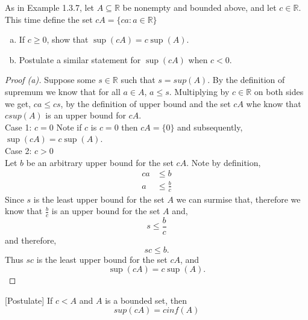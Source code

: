 \documentclass[12pt]{article}
\makeatletter
\theoremstyle{homework}
\newenvironment{exercise}[1]
{\def\@currentlabel{#1}\exercisecore}
{\endexercisecore}
\newcommand{\Reals}{\ensuremath{\mathbb R}}
\let\RR\Reals
\makeatother
\begin{document}
\begin{exercise}{1.3.5} As in Example 1.3.7, let $A \subseteq \RR$ be nonempty and bounded above, and let $c \in \RR$. 
  This time define the set $cA = \{ca: a\in \RR\}$  
  \begin{enumerate}[(a)]
  \item If $c\ge 0$, show that $\sup(cA) = c\sup(A)$.
  \item Postulate a similar statement for $\sup(cA)$ when $c<0$.
  \end{enumerate}
  \end{exercise}
  \begin{proof}[Proof (a)] 
    Suppose some $s \in \RR$ such that $s = sup(A)$. By the definition of supremum we know that for all $a \in A$, $a \le s$.
  Multiplying by $c \in \RR$ on both sides we get, $ca \le cs$, by the definition of upper bound and the set $cA$ whe know that $csup(A)$ is an upper bound for $cA$. \\

Case 1: $c = 0$ 
  Note if $c$ is $c = 0$ then $cA = \{0\}$ and subsequently, $\sup(cA) = c\sup(A)$. \\

  Case 2: $c > 0$\\
    Let $b$ be an arbitrary upper bound for the set $cA$. Note by definition,
    \begin{align*}
      ca &\le b\\
      a &\le \frac{b}{c}
    \end{align*} 
    Since $s$ is the least upper bound for the set $A$ we can surmise that, therefore we know that $\frac{b}{c}$ is an upper bound for the set $A$ and,
    \begin{equation*}
      s \le \frac{b}{c}
    \end{equation*}
    and therefore,
    \begin{equation*}
      sc \le b.
    \end{equation*}
    Thus $sc$ is the least upper bound for the set $cA$, and 
    \begin{equation*}
      \sup(cA) = c\sup(A).
    \end{equation*}
  \end{proof}


  [Postulate] If $c < A$ and $A$ is a bounded set, then
  \begin{equation*}
    sup(cA) = cinf(A)
  \end{equation*}
  
\end{document}
